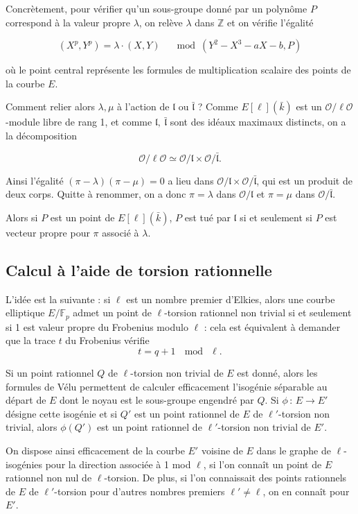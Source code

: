 \documentclass[11pt,a4paper]{article}
\newcommand{\Z}{\mathbb{Z}}
\newcommand{\F}{\mathbb{F}}
\renewcommand{\O}{\mathcal{O}}
\newcommand{\vers}{\rightarrow}
\renewcommand{\frak}{\mathfrak}
\newcommand{\de}{\,:\,}
\theoremstyle{definition}
\begin{document}
Concrètement, pour vérifier qu'un sous-groupe donné par un polynôme $P$ correspond à la valeur propre $\lambda$, on relève $\lambda$ dans $\Z$ et on vérifie l'égalité

$$ (X^p,Y^p)=\lambda\cdot (X,Y)\quad \mod (Y^2-X^3-aX-b, P)$$

où le point central représente les formules de multiplication scalaire des points de la courbe $E$.

Comment relier alors $\lambda,\mu$ à l'action de $\frak l$ ou $\bar{\frak l}$ ?
Comme $E[\ell](\bar{k})$ est un $\O/\ell\O$-module libre de rang 1, et comme $\frak l,\ \bar{\frak l}$ sont des idéaux maximaux distincts, on a la décomposition

$$\O/\ell\O \simeq \O/\frak l \times \O/\bar{\frak l}.$$

Ainsi l'égalité $(\pi-\lambda)(\pi-\mu)=0$ a lieu dans $\O/\frak l \times \O/\bar{\frak l}$, qui est un produit de deux corps. Quitte à renommer, on a donc $\pi=\lambda$ dans $\O/\frak l$ et $\pi=\mu$ dans $\O/\bar{\frak l}$.

Alors si $P$ est un point de $E[\ell](\bar{k})$, $P$ est tué par $\frak l$ si et seulement si $P$ est vecteur propre pour $\pi$ associé à $\lambda$.


\newpage


\subsection{Calcul à l'aide de torsion rationnelle}

L'idée est la suivante : si $\ell$ est un nombre premier d'Elkies, alors une courbe elliptique $E/\F_p$ admet un point de $\ell$-torsion rationnel non trivial si et seulement si 1 est valeur propre du Frobenius modulo $\ell$ : cela est équivalent à demander que la trace $t$ du Frobenius vérifie
$$t = q+1 \ \mod\ \ell.$$

Si un point rationnel $Q$ de $\ell$-torsion non trivial de $E$ est donné, alors les formules de Vélu permettent de calculer efficacement l'isogénie séparable au départ de $E$ dont le noyau est le sous-groupe engendré par $Q$. Si $\phi\de E\vers E'$ désigne cette isogénie et si $Q'$ est un point rationnel de $E$ de $\ell'$-torsion non trivial, alors $\phi(Q')$ est un point rationnel de $\ell'$-torsion non trivial de $E'$.

On dispose ainsi efficacement de la courbe $E'$ voisine de $E$ dans le graphe de $\ell$-isogénies pour la direction associée à 1 mod $\ell$, si l'on connaît un point de $E$ rationnel non nul de $\ell$-torsion. De plus, si l'on connaissait des points rationnels de $E$ de $\ell'$-torsion pour d'autres nombres premiers $\ell'\neq \ell$, on en connaît pour $E'$.
\end{document}
